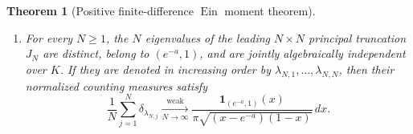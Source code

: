 \documentclass[11pt]{article}
\newtheorem{theorem}{Theorem}[section]
\theoremstyle{definition}
\theoremstyle{remark}
\newcommand{\Ein}{\operatorname{Ein}}
\begin{document}
\begin{theorem}[Positive finite-difference $\Ein$ moment theorem]
\begin{enumerate}
\begin{equation}
 J=
 \begin{pmatrix}
 \alpha_0&\sqrt{\beta_1}&&\\
 \sqrt{\beta_1}&\alpha_1&\sqrt{\beta_2}&\\
 &\sqrt{\beta_2}&\alpha_2&\ddots\\
 &&\ddots&\ddots
 \end{pmatrix}
\end{equation}
defines a bounded self-adjoint operator on $\ell^2(\mathbb N_0)$.
It has simple purely absolutely continuous spectrum
\[
 \sigma(J)=[e^{-a},1]
\]
of multiplicity one.
Its monic recurrence coefficients lie in the Nevai class of this interval:
\begin{equation}\label{eq:positive-ein-Nevai}
 \alpha_n\longrightarrow\frac{1+e^{-a}}2,
 \qquad
 \beta_n\longrightarrow\frac{(1-e^{-a})^2}{16}.
\end{equation}
\item For every $N\geq1$, the $N$ eigenvalues of the leading
$N\times N$ principal truncation $J_N$ are distinct, belong to
$(e^{-a},1)$, and are jointly algebraically independent over $K$.
If they are denoted in increasing order by
$\lambda_{N,1},\ldots,\lambda_{N,N}$, then their normalized counting
measures satisfy
\begin{equation}\label{eq:positive-ein-arcsine}
 \frac1N\sum_{j=1}^N\delta_{\lambda_{N,j}}
 \xrightarrow[N\to\infty]{\mathrm{weak}}
 \frac{\mathbf 1_{(e^{-a},1)}(x)}
 {\pi\sqrt{(x-e^{-a})(1-x)}}\,dx.
\end{equation}
\end{enumerate}
\end{theorem}
\end{document}
